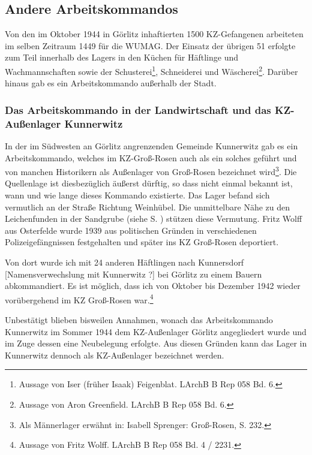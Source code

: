 \subsection{Andere Arbeitskommandos}
\label{lagerarbeit}
Von den im Oktober 1944 in Görlitz inhaftierten 1500 KZ-Gefangenen arbeiteten im selben Zeitraum 1449 für die WUMAG. Der Einsatz der übrigen 51 erfolgte zum Teil innerhalb des Lagers in den Küchen für Häftlinge und Wachmannschaften sowie der Schusterei\footnote{Aussage von Iser (früher Isaak) Feigenblat. LArchB B Rep 058 Bd. 6.}, Schneiderei und Wäscherei\footnote{Aussage von Aron Greenfield. LArchB B Rep 058 Bd. 6.}. Darüber hinaus gab es ein Arbeitskommando außerhalb der Stadt.

\subsubsection{Das Arbeitskommando in der Landwirtschaft und das KZ-Außenlager Kunnerwitz}
\label{alkunnerwizt}
In der im Südwesten an Görlitz angrenzenden Gemeinde Kunnerwitz gab es ein Arbeitskommando, welches im KZ-Groß-Rosen auch als ein solches geführt und von manchen Historikern als Außenlager von Groß-Rosen bezeichnet wird\footnote{Als Männerlager erwähnt in: Isabell Sprenger: Groß-Rosen, S. 232.}. Die Quellenlage ist diesbezüglich äußerst dürftig, so dass nicht einmal bekannt ist, wann und wie lange dieses Kommando existierte. Das Lager befand sich vermutlich an der Straße Richtung Weinhübel. Die unmittelbare Nähe zu den Leichenfunden in der Sandgrube (siehe S. \pageref{kunnerwitz}) stützen diese Vermutung.\newline
Fritz Wolff aus Osterfelde wurde 1939 aus politischen Gründen in verschiedenen Polizeigefängnissen festgehalten und später ins KZ Groß-Rosen deportiert.
\begin{leftbar}
Von dort wurde ich mit 24 anderen Häftlingen nach Kunnersdorf [Namensverwechslung mit Kunnerwitz ?] bei Görlitz zu einem Bauern abkommandiert. Es ist möglich, dass ich von Oktober bis Dezember 1942 wieder vorübergehend im KZ Groß-Rosen war.\footnote{Aussage von Fritz Wolff. LArchB B Rep 058 Bd. 4 / 2231.}
\end{leftbar}

Unbestätigt blieben bisweilen Annahmen, wonach das Arbeitskommando Kunnerwitz im Sommer 1944 dem KZ-Außenlager Görlitz angegliedert wurde und im Zuge dessen eine Neubelegung erfolgte. Aus diesen Gründen kann das Lager in Kunnerwitz dennoch als KZ-Außenlager bezeichnet werden.


